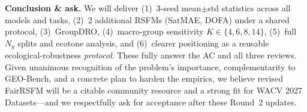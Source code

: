 \documentclass[10pt,twocolumn,letterpaper]{article}
\begin{document}
{\vspace{-0.15em}
\textbf{Conclusion \& ask.}
We will deliver (1)~3-seed mean$\pm$std statistics across all models and tasks, (2)~2 additional RSFMs (SatMAE, DOFA) under a shared protocol, (3)~GroupDRO, (4)~macro-group sensitivity $K{\in}\{4,6,8,14\}$, (5)~full $N_g$ splits and ecotone analysis, and (6)~clearer positioning as a reusable ecological-robustness \emph{protocol}. These fully answer the AC and all three reviews. Given unanimous recognition of the problem's importance, complementarity to GEO-Bench, and a concrete plan to harden the empirics, we believe revised FairRSFM will be a citable community resource and a strong fit for WACV 2027 Datasets---and we respectfully ask for acceptance after these Round~2 updates.
}
\end{document}

